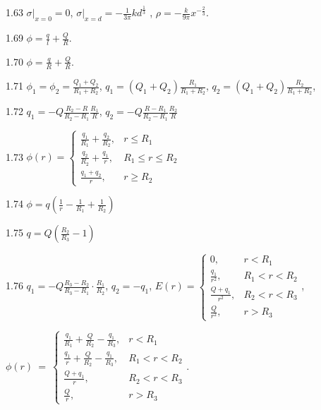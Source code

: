 \begin{Solution}{1.{63}}
	$\left. \sigma\right|_{x=0} = 0$, $\left. \sigma\right|_{x=d} = -\frac{1}{3\pi}kd^{\frac13}$ , $\rho = -\frac{k}{9\pi} x^{-\frac{2}{3}}$.
\end{Solution}
\begin{Solution}{1.{69}}
		$\phi = \frac{q}{l} + \frac{Q}{R}.$
	
\end{Solution}
\begin{Solution}{1.{70}}
		$\phi = \frac{q}{R} + \frac{Q}{R}.$
	
\end{Solution}
\begin{Solution}{1.{71}}
	$\phi_1 = \phi_2 = \frac{Q_1 + Q_2}{R_1 + R_2}$, $q_1 = (Q_1 + Q_2) \frac{R_1}{R_1 + R_2}$, $q_2 = (Q_1 + Q_2) \frac{R_2}{R_1 + R_2}$,
\end{Solution}
\begin{Solution}{1.{72}}
	$q_1 = -Q\frac{R_2-R}{R_2-R_1}\frac{R_1}{R}$, $q_2 = -Q\frac{R-R_1}{R_2-R_1}\frac{R_2}{R}$
\end{Solution}
\begin{Solution}{1.{73}}
	$
		\phi(r) =
		\begin{cases}
			\frac{q_1}{R_1} + \frac{q_2}{R_2}, & r \le R_1         \\
			\frac{q_2}{R_2} + \frac{q_1}{r} ,  & R_1 \le r \le R_2 \\
			\frac{q_1 + q_2}{r} ,              & r \ge R_2
		\end{cases}
	$
\end{Solution}
\begin{Solution}{1.{74}}
	$\phi = q\left( \frac{1}{r} - \frac{1}{R_1} + \frac{1}{R_2}\right) $
\end{Solution}
\begin{Solution}{1.{75}}
	$q=Q\left( \frac{R_2}{R_3} - 1\right) $
\end{Solution}
\begin{Solution}{1.{76}}
	$q_1 = - Q\frac{R_3 - R_2}{R_3 - R_1}\cdot \frac{R_1}{R_2}$, $q_2= -q_1$,
	$
		E(r) =
		\begin{cases}
			0,                 & r < R_1       \\
			\frac{q_1}{r^2},   & R_1 < r < R_2 \\
			\frac{Q+q_1}{r^2}, & R_2 < r < R_3 \\
			\frac{Q}{r^2},     & r > R_3
		\end{cases}
	$,

	$
		\phi(r)~=~%
		\begin{cases}
			\frac{q_1}{R_1} + \frac{Q}{R_2} - \frac{q_1}{R_3}, & r < R_1       \\
			\frac{q_1}{r} + \frac{Q}{R_2} - \frac{q_1}{R_3},   & R_1 < r < R_2 \\
			\frac{Q+q_1}{r},                                   & R_2 < r < R_3 \\
			\frac{Q}{r},                                       & r > R_3
		\end{cases}
	$.
\end{Solution}
